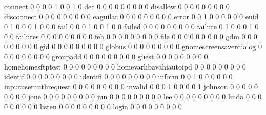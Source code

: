 \documentclass[compress,8pt]{beamer}
\begin{document}
\begin{frame}
\begin{Schunk}
  connect                                    0   0   0   0   1   0   0   1   0
  dec                                        0   0   0   0   0   0   0   0   0
  disallow                                   0   0   0   0   0   0   0   0   0
  disconnect                                 0   0   0   0   0   0   0   0   0
  eaguilar                                   0   0   0   0   0   0   0   0   0
  error                                      0   0   1   0   0   0   0   0   0
  euid                                       0   1   0   0   0   1   0   0   0
  fail                                       0   0   0   1   0   0   1   0   0
  failed                                     0   0   0   0   0   0   0   0   0
  failure                                    0   1   0   0   0   1   0   0   0
  failures                                   0   0   0   0   0   0   0   0   0
  feb                                        0   0   0   0   0   0   0   0   0
  file                                       0   0   0   0   0   0   0   0   0
  gdm                                        0   0   0   0   0   0   0   0   0
  gid                                        0   0   0   0   0   0   0   0   0
  globus                                     0   0   0   0   0   0   0   0   0
  gnomescreensaverdialog                     0   0   0   0   0   0   0   0   0
  groupadd                                   0   0   0   0   0   0   0   0   0
  guest                                      0   0   0   0   0   0   0   0   0
  homehomesftptest                           0   0   0   0   0   0   0   0   0
  homevarlibavahiautoipd                     0   0   0   0   0   0   0   0   0
  identif                                    0   0   0   0   0   0   0   0   0
  identifi                                   0   0   0   0   0   0   0   0   0
  inform                                     0   0   1   0   0   0   0   0   0
  inputuserauthrequest                       0   0   0   0   0   0   0   0   0
  invalid                                    0   0   0   1   0   0   0   0   1
  johnson                                    0   0   0   0   0   0   0   0   0
  jone                                       0   0   0   0   0   0   0   0   0
  jun                                        0   0   0   0   0   0   0   0   0
  lee                                        0   0   0   0   0   0   0   0   0
  linda                                      0   0   0   0   0   0   0   0   0
  listen                                     0   0   0   0   0   0   0   0   0
  login                                      0   0   0   0   0   0   0   0   0

\end{Schunk}
\end{frame}
\end{document}
